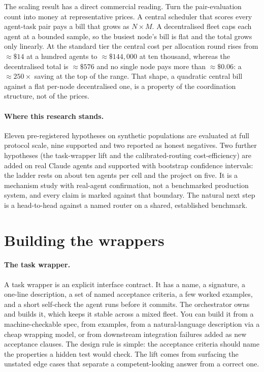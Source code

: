 \documentclass[11pt]{article}
\begin{document}
The scaling result has a direct commercial reading. Turn the pair-evaluation count into money at representative prices. A central scheduler that scores every agent-task pair pays a bill that grows as $N\times M$. A decentralised fleet caps each agent at a bounded sample, so the busiest node's bill is flat and the total grows only linearly. At the standard tier the central cost per allocation round rises from $\approx\$14$ at a hundred agents to $\approx\$144{,}000$ at ten thousand, whereas the decentralised total is $\approx\$576$ and no single node pays more than $\approx\$0.06$: a $\approx 250\times$ saving at the top of the range. That shape, a quadratic central bill against a flat per-node decentralised one, is a property of the coordination structure, not of the prices.

\paragraph{Where this research stands.} Eleven pre-registered hypotheses on synthetic populations are evaluated at full protocol scale, nine supported and two reported as honest negatives. Two further hypotheses (the task-wrapper lift and the calibrated-routing cost-efficiency) are added on real Claude agents and supported with bootstrap confidence intervals: the ladder rests on about ten agents per cell and the project on five. It is a mechanism study with real-agent confirmation, not a benchmarked production system, and every claim is marked against that boundary. The natural next step is a head-to-head against a named router on a shared, established benchmark.

\section{Building the wrappers}

\paragraph{The task wrapper.} A task wrapper is an explicit interface contract. It has a name, a signature, a one-line description, a set of named acceptance criteria, a few worked examples, and a short self-check the agent runs before it commits. The orchestrator owns and builds it, which keeps it stable across a mixed fleet. You can build it from a machine-checkable spec, from examples, from a natural-language description via a cheap wrapping model, or from downstream integration failures added as new acceptance clauses. The design rule is simple: the acceptance criteria should name the properties a hidden test would check. The lift comes from surfacing the unstated edge cases that separate a competent-looking answer from a correct one.
\end{document}
